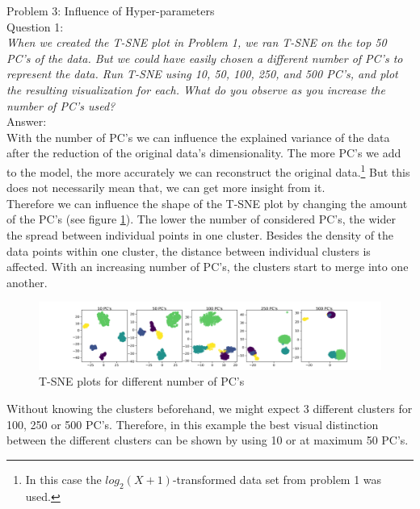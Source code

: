 Problem 3: Influence of Hyper-parameters\\
Question 1:\\
\textsl{When we created the T-SNE plot in Problem 1, we ran T-SNE on the top 50 PC's of the data. But we could have easily chosen a different number of PC's to represent the data. Run T-SNE using 10, 50, 100, 250, and 500 PC's, and plot the resulting visualization for each. What do you observe as you increase the number of PC's used?}\\

Answer:\\
With the number of PC's we can influence the explained variance of the data after the reduction of the original data's dimensionality. The more PC's we add to the model, the more accurately we can reconstruct the original data.\footnote{In this case the $log_2(X+1)$-transformed data set from problem 1 was used.} But this does not necessarily mean that, we can get more insight from it.\\ 
	
Therefore we can influence the shape of the T-SNE plot by changing the amount of the PC's (see figure \ref{fig:TSNE_PCs_labelled}). The lower the number of considered PC's, the wider the spread between individual points in one cluster. Besides the density of the data points within one cluster, the distance between individual clusters is affected. With an increasing number of PC's, the clusters start to merge into one another.\\

\begin{figure}[h]
	\centering
	\includegraphics[width=1.0\linewidth, trim={4cm 0 3.5cm 0}]{problem_03/TSNE_PCs_labelled}
	\caption{T-SNE plots for different number of PC's}
	\label{fig:TSNE_PCs_labelled}
\end{figure}

Without knowing the clusters beforehand, we might expect 3 different clusters for 100, 250 or 500 PC's. Therefore, in this example the best visual distinction between the different clusters can be shown by using 10 or at maximum 50 PC's. 